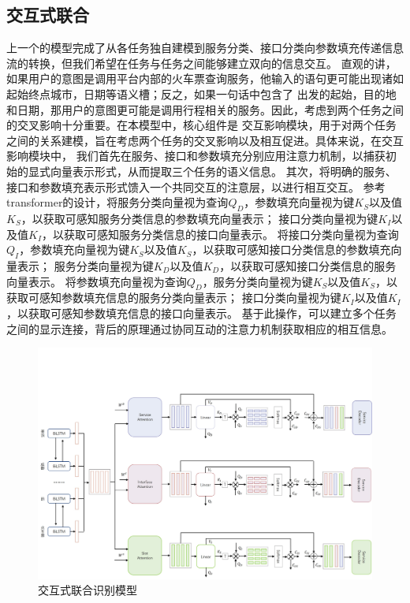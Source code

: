 \subsection{交互式联合}
上一个的模型完成了从各任务独自建模到服务分类、接口分类向参数填充传递信息流的转换，但我们希望在任务与任务之间能够建立双向的信息交互。
直观的讲，如果用户的意图是调用平台内部的火车票查询服务，他输入的语句更可能出现诸如起始终点城市，日期等语义槽；反之，如果一句话中包含了
出发的起始，目的地和日期，那用户的意图更可能是调用行程相关的服务。因此，考虑到两个任务之间的交叉影响十分重要。在本模型中，核心组件是
交互影响模块，用于对两个任务之间的关系建模，旨在考虑两个任务的交叉影响以及相互促进。具体来说，在交互影响模块中，
我们首先在服务、接口和参数填充分别应用注意力机制，以捕获初始的显式向量表示形式，从而提取三个任务的语义信息。
其次，将明确的服务、接口和参数填充表示形式馈入一个共同交互的注意层，以进行相互交互。
参考transformer的设计，将服务分类向量视为查询$Q_D$，参数填充向量视为键$K_S$以及值$K_S$，以获取可感知服务分类信息的参数填充向量表示；
接口分类向量视为键$K_I$以及值$K_I$，以获取可感知服务分类信息的接口向量表示。
将接口分类向量视为查询$Q_I$，参数填充向量视为键$K_S$以及值$K_S$，以获取可感知接口分类信息的参数填充向量表示；
服务分类向量视为键$K_D$以及值$K_D$，以获取可感知接口分类信息的服务向量表示。
将参数填充向量视为查询$Q_D$，服务分类向量视为键$K_S$以及值$K_S$，以获取可感知参数填充信息的服务分类向量表示；
接口分类向量视为键$K_I$以及值$K_I$，以获取可感知参数填充信息的接口向量表示。
基于此操作，可以建立多个任务之间的显示连接，背后的原理通过协同互动的注意力机制获取相应的相互信息。

\begin{figure}[htbp]
  \centering
  \includegraphics[width=16cm]{./images/co-interactive.jpg}
  \caption{交互式联合识别模型}
  \label{fig:lianhe2}
\end{figure}


